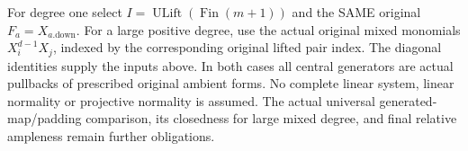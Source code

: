 For degree one select $I=\operatorname{ULift}(\operatorname{Fin}(m+1))$ and the
SAME original $F_a=X_{a.\mathrm{down}}$. For a large positive degree, use the
actual original mixed monomials $X_i^{d-1}X_j$, indexed by the corresponding
original lifted pair index. The diagonal identities supply the inputs above.
In both cases all central generators are actual pullbacks of prescribed original
ambient forms. No complete linear system, linear normality or projective normality
is assumed. The actual universal generated-map/padding comparison, its closedness
for large mixed degree, and final relative ampleness remain further obligations.
